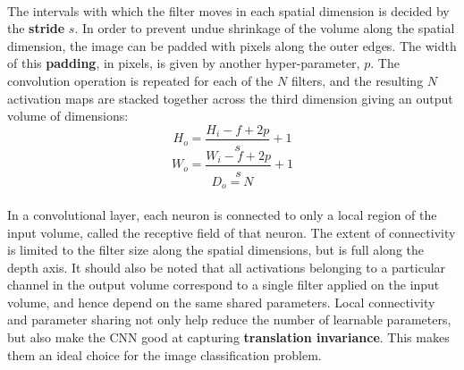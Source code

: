 \documentclass[12pt, a4paper]{report}
\begin{document}
\paragraph{}
The intervals with which the filter moves in each spatial dimension is decided by the \textbf{stride} $s$. In order to prevent undue shrinkage of the volume along the spatial dimension, the image can be padded with pixels along the outer edges. The width of this \textbf{padding}, in pixels, is given by another hyper-parameter, $p$.\cite{dlai4, muruganandham2016semantic} The convolution operation is repeated for each of the $N$ filters, and the resulting $N$ activation maps are stacked together across the third dimension giving an output volume of dimensions:\\
\begin{displaymath}
H_{o}=\frac{H_{i}-f+2p}{s}+1
\end{displaymath}
\begin{displaymath}
W_{o}=\frac{W_{i}-f+2p}{s}+1
\end{displaymath}
\begin{displaymath}
D_{o}=N
\end{displaymath}
\paragraph{}
In a convolutional layer, each neuron is connected to only a local region of the input volume, called the receptive field of that neuron. The extent of connectivity is limited to the filter size along the spatial dimensions, but is full along the depth axis.\cite{cs231n} It should also be noted that all activations belonging to a particular channel in the output volume correspond to a single filter applied on the input volume, and hence depend on the same shared parameters. Local connectivity and parameter sharing not only help reduce the number of learnable parameters, but also make the CNN good at capturing \textbf{translation invariance}. This makes them an ideal choice for the image classification problem.
\end{document}
